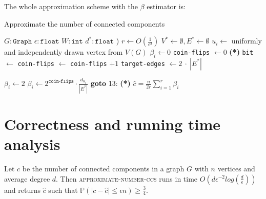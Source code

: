 The whole approximation scheme with the $\beta$ estimator is:
\begin{algorithm}[H]
\caption{Approximate the number of connected components}
\begin{algorithmic}[1]
    \State $G \colon\texttt{Graph}$
    \State $\epsilon \colon\texttt{float}$
    \State $W \colon\texttt{int}$ 
    \State $d^* \colon\texttt{float}$  
\Statex )
    \State $r \gets O\!\left(\tfrac{1}{\epsilon^2}\right)$
    \State $V^* \gets\emptyset, E^*\gets\emptyset$  
        \State $u_i \gets$ uniformly and independently drawn vertex from $V(G)$
        \State $\beta_i \gets 0$
        \State \texttt{coin-flips} $\gets 0$
        \State {} 
        \State \textbf{(*)} \texttt{bit} $\gets$ 
        \State \texttt{coin-flips} $\gets$ \texttt{coin-flips} $+ 1$ 
            \State \texttt{target-edges} $\gets 2\ \cdot\ |E^*|$
                \State {}
            \EndWhile
            
                    \State $\beta_i \gets 2$
                \Else
                    \State $\beta_i \gets 2^{\texttt{coin-flips}} \cdot \tfrac{d_{u_i}}{|E^*|}$
                \EndIf
            \Else
                \State \textbf{goto} 13: \textbf{(*)} 
            \EndIf
        \EndIf
    \EndFor
    \State \Return $\hat{c} = \tfrac{n}{2r} \sum_{i=1}^{r} \beta_i$
\EndFunction
\end{algorithmic}
\end{algorithm}

\section {Correctness and running time analysis}
\begin{theorem}
\label{approx-ccs}
    Let $c$ be the number of connected components in a graph $G$ with $n$ vertices and average degree $d$. Then \textsc{approximate-number-ccs} runs in time $O(d\epsilon^{-2}log(\frac{d}\epsilon))$ and returns $\hat{c}$ such that $\mathbb{P}(|c - \hat{c}| \leq \epsilon n) \geq \frac34.$
\end{theorem}

